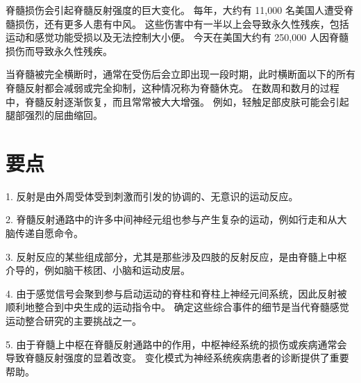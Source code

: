 脊髓损伤会引起脊髓反射强度的巨大变化。 每年，大约有 11,000 名美国人遭受脊髓损伤，还有更多人患有中风。 这些伤害中有一半以上会导致永久性残疾，包括运动和感觉功能受损以及无法控制大小便。 今天在美国大约有 250,000 人因脊髓损伤而导致永久性残疾。

当脊髓被完全横断时，通常在受伤后会立即出现一段时期，此时横断面以下的所有脊髓反射都会减弱或完全抑制，这种情况称为脊髓休克。 在数周和数月的过程中，脊髓反射逐渐恢复，而且常常被大大增强。 例如，轻触足部皮肤可能会引起腿部强烈的屈曲缩回。


\section{要点}
1. 反射是由外周受体受到刺激而引发的协调的、无意识的运动反应。 

2. 脊髓反射通路中的许多中间神经元组也参与产生复杂的运动，例如行走和从大脑传递自愿命令。 

3. 反射反应的某些组成部分，尤其是那些涉及四肢的反射反应，是由脊髓上中枢介导的，例如脑干核团、小脑和运动皮层。 

4. 由于感觉信号会聚到参与启动运动的脊柱和脊柱上神经元间系统，因此反射被顺利地整合到中央生成的运动指令中。 确定这些综合事件的细节是当代脊髓感觉运动整合研究的主要挑战之一。 

5. 由于脊髓上中枢在脊髓反射通路中的作用，中枢神经系统的损伤或疾病通常会导致脊髓反射强度的显着改变。 变化模式为神经系统疾病患者的诊断提供了重要帮助。


